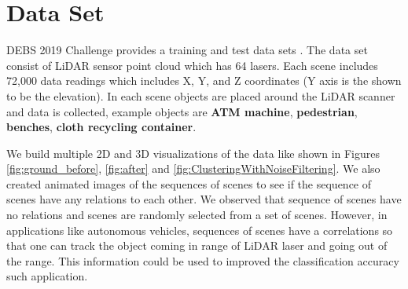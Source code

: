 \section{Data Set}
DEBS 2019  Challenge provides a training and test data sets \cite{DEBSGC2019}. 
The data set consist of LiDAR sensor point cloud which has 64 lasers. Each scene includes 72,000 data readings which includes  X, Y, and Z coordinates (Y axis is the shown to be the elevation). 
In each scene objects are placed around the LiDAR scanner and data is collected, example objects are \textbf{ATM machine}, \textbf{pedestrian}, \textbf{benches}, \textbf{cloth recycling container}. 

We build multiple 2D and 3D visualizations of the data like shown in Figures \ref{fig:ground_before},  \ref{fig:after} and \ref{fig:ClusteringWithNoiseFiltering}. 
We also created animated images of the sequences of scenes to see if the sequence of scenes have any relations to each other. 
We observed that sequence of scenes have no relations and scenes are randomly selected from a set of scenes. 
However, in applications like autonomous vehicles, sequences of scenes have a correlations so 
that one can track the object coming in range of LiDAR laser and going out of the range. 
This information could be used to improved the classification accuracy such application.    


% 


% 

